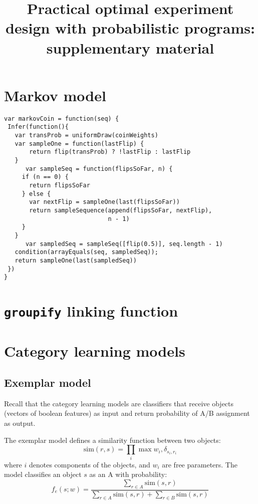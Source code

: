 \documentclass{article}
\title{Practical optimal experiment design with probabilistic programs: supplementary material}
\begin{document}

\maketitle

\section{Markov model}

\begin{lstlisting}[upquote=true]
var markovCoin = function(seq) {
 Infer(function(){
   var transProb = uniformDraw(coinWeights)
   var sampleOne = function(lastFlip) {
       return flip(transProb) ? !lastFlip : lastFlip
   }
	  var sampleSeq = function(flipsSoFar, n) {
     if (n == 0) {
       return flipsSoFar
     } else {
       var nextFlip = sampleOne(last(flipsSoFar))
       return sampleSequence(append(flipsSoFar, nextFlip),
                             n - 1)
     }
   }
	  var sampledSeq = sampleSeq([flip(0.5)], seq.length - 1)
   condition(arrayEquals(seq, sampledSeq));
   return sampleOne(last(sampledSeq))
 })
}
\end{lstlisting}

\section{\texttt{groupify} linking function}

\section{Category learning models}

\subsection{Exemplar model}

Recall that the category learning models are classifiers that receive objects (vectors of boolean features) as input and return probability of A/B assignment as output.

The exemplar model defines a similarity function between two objects:
$$ \text{sim}(r, s) = \prod_i{\max{w_i, \delta_{s_i,r_i}}  }$$
where $i$ denotes components of the objects, and $w_i$ are free parameters.
The model classifies an object $s$ as an A with probability:
$$ f_e(s ; w) = \frac{ \sum\limits_{r \in A}{\text{sim}(s,r)}}{
\sum\limits_{r \in A}{\text{sim}(s,r)} +
\sum\limits_{r \in B}{\text{sim}(s,r)}
 }$$
\end{document}
